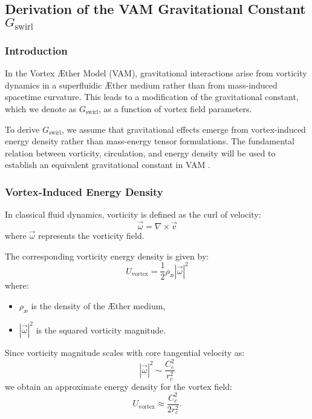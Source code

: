 
\subsection{Derivation of the VAM Gravitational Constant \(  G_\text{swirl} \)}

\subsubsection*{Introduction}
In the Vortex Æther Model (VAM), gravitational interactions arise from vorticity dynamics in a superfluidic Æther medium rather than from mass-induced spacetime curvature. This leads to a modification of the gravitational constant, which we denote as \(  G_\text{swirl} \), as a function of vortex field parameters.

To derive \(  G_\text{swirl} \), we assume that gravitational effects emerge from vortex-induced energy density rather than mass-energy tensor formulations. The fundamental relation between vorticity, circulation, and energy density will be used to establish an equivalent gravitational constant in VAM \cite{onsager_superfluid, barcelo_superfluid, moffatt_helicity}.

\subsubsection*{Vortex-Induced Energy Density}
In classical fluid dynamics, vorticity is defined as the curl of velocity:
\begin{equation*}
    \vec{\omega} = \nabla \times \vec{v}
\end{equation*}
where \( \vec{\omega} \) represents the vorticity field.

The corresponding vorticity energy density is given by:
\begin{equation*}
    U_\text{vortex} = \frac{1}{2} \rho_\text{\ae} |\vec{\omega}|^2
\end{equation*}
where:
\begin{itemize}
    \item \( \rho_\text{\ae} \) is the density of the Æther medium,
    \item \( |\vec{\omega}|^2 \) is the squared vorticity magnitude.
\end{itemize}

Since vorticity magnitude scales with core tangential velocity as:
\begin{equation*}
    |\vec{\omega}|^2 \sim \frac{C_e^2}{r_c^2}
\end{equation*}
we obtain an approximate energy density for the vortex field:
\begin{equation*}
    U_\text{vortex} \approx \frac{C_e^2}{2 r_c^2}.
\end{equation*}

